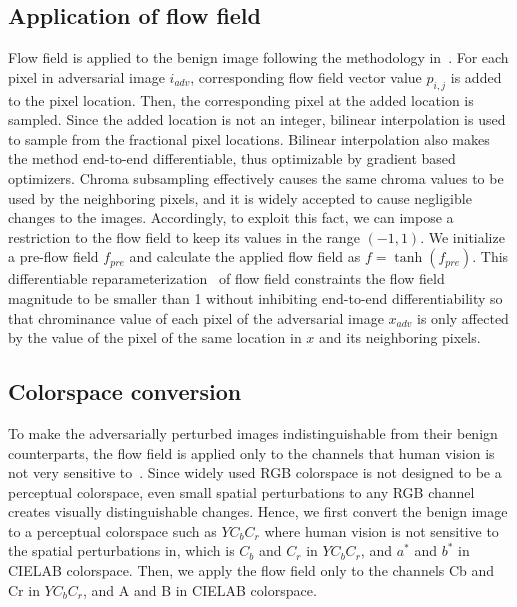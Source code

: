 \subsection{Application of flow field}
Flow field is applied to the benign image following the methodology in~\cite{xiao2018spatially}. For each pixel in adversarial image \(i_{adv}\), corresponding flow field vector value \(p_{i,j}\) is added to the pixel location. Then, the corresponding pixel at the added location is sampled. Since the added location is not an integer, bilinear interpolation is used to sample from the fractional pixel locations. Bilinear interpolation also makes the method end-to-end differentiable, thus optimizable by gradient based optimizers.
Chroma subsampling effectively causes the same chroma values to be used by the neighboring pixels, and it is widely accepted to cause negligible changes to the images. Accordingly, to exploit this fact, we can impose a restriction to the flow field to keep its values in the range \((-1, 1)\). We initialize a pre-flow field \(f_{pre}\) and calculate the applied flow field as \(f = \tanh(f_{pre})\). This differentiable reparameterization~\cite{mordvintsev2018differentiable} of flow field constraints the flow field magnitude to be smaller than 1 without inhibiting end-to-end differentiability so that chrominance value of each pixel of the adversarial image \(x_{adv}\) is only affected by the value of the pixel of the same location in \(x\) and its neighboring pixels. %
\subsection{Colorspace conversion}
To make the adversarially perturbed images indistinguishable from their benign counterparts, the flow field is applied only to the channels that human vision is not very sensitive to~\cite{vorobyev2004ecology}. Since widely used RGB colorspace is not designed to be a perceptual colorspace, even small spatial perturbations to any RGB channel creates visually distinguishable changes. Hence, we first convert the benign image to a perceptual colorspace such as \(YC_{b}C_{r}\) where human vision is not sensitive to the spatial perturbations in, which is \(C_{b}\) and \(C_{r}\) in \(YC_{b}C_{r}\), and \(a^*\) and \(b^*\) in CIELAB colorspace. Then, we apply the flow field only to the channels Cb and Cr in \(YC_{b}C_{r}\), and A and B in CIELAB colorspace.

